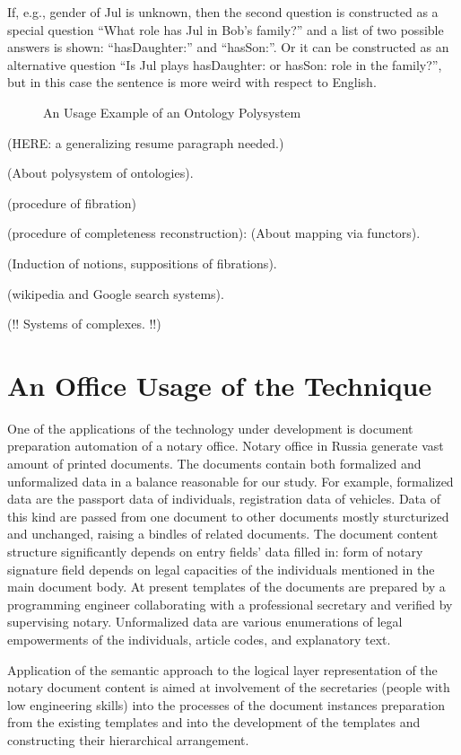 \documentclass[conference]{IEEEtran}
\begin{document}
If, e.g., gender of Jul is unknown, then the second question is constructed as a special question ``What role has Jul in Bob's family?'' and a list of two possible answers is shown: ``hasDaughter:'' and ``hasSon:''. Or it can be constructed as an alternative question ``Is Jul plays hasDaughter: or hasSon: role in the family?'', but in this case the sentence is more weird with respect to English.

\begin{figure}
\centering\sf
\def\svgwidth{0.9\linewidth}

\caption{An  Usage Example of an Ontology Polysystem}
\label{OPSA}
\end{figure}

(HERE: a generalizing resume paragraph needed.)

(About polysystem of ontologies).

(procedure of fibration)

(procedure of completeness reconstruction): (About mapping via functors).

(Induction of notions, suppositions of fibrations).

(wikipedia and Google search systems).

(!! Systems of complexes. !!)

\section{An Office Usage of the Technique}

One of the applications of the technology under development is document preparation automation of a notary office. Notary office in Russia generate vast amount of printed documents. The documents contain both formalized and unformalized data in a balance reasonable for our study. For example, formalized data are the passport data of individuals, registration data of vehicles. Data of this kind are passed from one document to other documents mostly sturcturized and unchanged, raising a bindles of related documents. The document content structure significantly depends on entry fields’ data filled in: form of notary signature field depends on legal capacities of the individuals mentioned in the main document body. At present templates of the documents are prepared by a programming engineer collaborating with a professional secretary and verified by supervising notary. Unformalized data are various enumerations of legal empowerments of the individuals, article codes, and explanatory text.

Application of the semantic approach to the logical layer representation of the notary document content is aimed at involvement of the secretaries (people with low engineering skills) into the processes of the document instances preparation from the existing templates and into the development of the templates and constructing their hierarchical arrangement.
\end{document}
